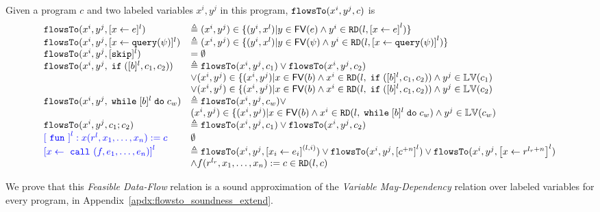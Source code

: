 \begin{defn}
  \label{def:feasible_flowsto}
  Given a program $c$ and two labeled variables $x^i, y^j$  in this program, 
  $\mathtt{flowsTo}(x^i, y^j, c)$ is 
    {\footnotesize
    \[
   \begin{array}{ll}
    \flowsto(x^i, y^j, \clabel{\assign{x}{\expr}}{}^l)  & \triangleq (x^i, y^j) \in \{ (y^i, x^l) | y \in \mathsf{FV}(\expr) 
    \land y^i \in \live(l, \clabel{\assign{x}{\expr}}^l) \}  \\
    \flowsto(x^i, y^j, \clabel{\assign{x}{\query(\qexpr)}}{}^l)  & \triangleq (x^i, y^j) \in \{ (y^i, x^l) | y \in \mathsf{FV}(\qexpr) 
    \land y^i \in \live(l,\clabel{\assign{x}{\query(\qexpr)}}^l) \}  \\
    \flowsto(x^i, y^j, [\eskip]^{l})  & = \emptyset \\
    \flowsto(x^i, y^j, \eif ([b]^l, c_1, c_2))  & \triangleq \flowsto(x^i, y^j, c_1) \lor \flowsto(x^i, y^j, c_2) \\ 
        & \lor (x^i, y^j) \in
       \{(x^i,y^j) | x \in \mathsf{FV}(b) \land 
      x^i \in \live(l, \eif ([b]^l, c_1, c_2)) \land  y^j \in \lvar(c_1) \\
       &\lor (x^i, y^j) \in \{(x^i,y^j) | x \in \mathsf{FV}(b) \land 
      x^i\in \live(l, \eif ([b]^l, c_1, c_2))  \land  y^j \in \lvar(c_2) \\
       \flowsto(x^i, y^j, \ewhile [b]^l \edo c_w)  & \triangleq  \flowsto(x^i, y^j, c_w)  \lor
       \\ & 
       (x^i, y^j) \in  \{(x^i,y^j) | x \in \mathsf{FV}(b) \land 
      x^i \in \live(l,   \ewhile [b]^l \edo c_w) \land  y^j \in \lvar(c_w) \\
       \flowsto(x^i, y^j, c_1 ;c_2)  & \triangleq \flowsto(x^i, y^j, c_1) \lor \flowsto(x^i, y^j, c_2) \\
       {\highlight{\clabel{\efun}^l: x(r^l, x_1, \ldots, x_n) := c}}& \emptyset\\
       {\highlight{\clabel{\assign{x}{\ecall(f, e_1, \ldots, e_n)}}^l } } 
       &     
       \triangleq
       \flowsto(x^i, y^j, \clabel{\assign{x_i}{e_i}}^{(l,i)}) \lor
       \flowsto(x^i, y^j, \clabel{c^{+n}}^l) \lor 
       \flowsto(x^i, y^j, \clabel{\assign{x}{r^{{l_r}+n}}}^{l}) 
       \\ &
       \land
       f(r^{l_r}, x_1, \ldots, x_n) := c\in \live(l, c)
   \end{array}
   \]
   }
   \end{defn}
%
We prove that this \emph{Feasible Data-Flow} relation is a sound approximation 
of the \emph{Variable May-Dependency} relation over labeled variables for every program,
in Appendix~\ref{apdx:flowsto_soundness_extend}.
%
